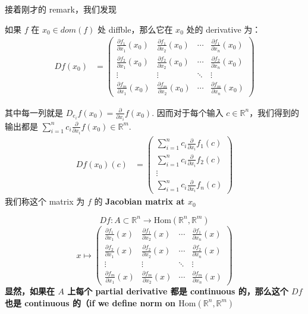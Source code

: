 接着刚才的 remark，我们发现
\begin{theorem}
    如果 $f $ 在 $x_0 \in dom(f) $ 处 diffble，那么它在 $x_0$ 处的 derivative 为：
    \begin{align}
        Df(x_0) 
        & = \begin{pmatrix}
        \frac{\partial f_1}{\partial x_1} (x_0)& \frac{\partial f_1}{\partial x_2}(x_0) & \cdots & \frac{\partial f_1}{\partial x_n}(x_0) \\
        \frac{\partial f_2}{\partial x_1} (x_0)& \frac{\partial f_2}{\partial x_2}(x_0) & \cdots & \frac{\partial f_2}{\partial x_n}(x_0) \\
        \vdots & \vdots & \ddots & \vdots \\
        \frac{\partial f_m}{\partial x_1}(x_0) & \frac{\partial f_m}{\partial x_2} (x_0)& \cdots & \frac{\partial f_m}{\partial x_n}(x_0)
        \end{pmatrix}
    \end{align}

    其中每一列就是 $D_{e_i} f(x_0) = \frac{\partial}{\partial x_i} f(x_0)$. 因而对于每个输入 $ c \in \mathbb{R}^n$，我们得到的输出都是 $\sum_{i=1}^n c_i \frac{\partial}{\partial x_i} f(x_0) \in \mathbb{R}^m$.\\
    
    \begin{align}
        Df(x_0) (c)
        & = \begin{pmatrix}
        \sum_{i=1}^n c_i \frac{\partial}{\partial x_i} f_1(c) \\
        \sum_{i=1}^n c_i \frac{\partial}{\partial x_i} f_2(c) \\
        \vdots  \\
        \sum_{i=1}^n c_i \frac{\partial}{\partial x_i} f_n(c)
        \end{pmatrix}
    \end{align}
我们称这个 matrix 为 $f$ 的 \textbf{Jacobian matrix at $x_0$}
\end{theorem}

\begin{remark}
    $$
        Df: A \subset \mathbb{R}^n \rightarrow \text{Hom}(\mathbb{R}^n, \mathbb{R}^m) 
    $$
    $$
        x \mapsto 
        \begin{pmatrix}
        \frac{\partial f_1}{\partial x_1} (x)& \frac{\partial f_1}{\partial x_2}(x) & \cdots & \frac{\partial f_1}{\partial x_n}(x) \\
        \frac{\partial f_2}{\partial x_1} (x)& \frac{\partial f_2}{\partial x_2}(x) & \cdots & \frac{\partial f_2}{\partial x_n}(x) \\
        \vdots & \vdots & \ddots & \vdots \\
        \frac{\partial f_m}{\partial x_1}(x) & \frac{\partial f_m}{\partial x_2} (x)& \cdots & \frac{\partial f_m}{\partial x_n}(x)
        \end{pmatrix}
    $$
    \textbf{显然，如果在 $A$ 上每个 partial derivative 都是 continuous 的，那么这个 $Df$ 也是 continuous 的（if we define norm on $\text{Hom}(\mathbb{R}^n, \mathbb{R}^m) $}
\end{remark}

